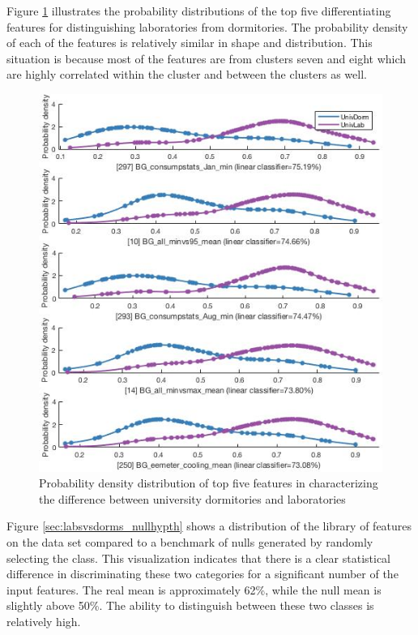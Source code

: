 Figure \ref{fig:topfivefeatures_dormvslab} illustrates the probability distributions of the top five differentiating features for distinguishing laboratories from dormitories. The probability density of each of the features is relatively similar in shape and distribution. This situation is because most of the features are from clusters seven and eight which are highly correlated within the cluster and between the clusters as well.

\begin{figure}[ht!]
\begin{center}
\includegraphics[width=0.7\columnwidth]{figures/Output_UnivDormVsLab_Features_1-5/Output_UnivDormVsLab_Features_1-5}
\caption{{Probability density distribution of top five features in characterizing the difference between university dormitories and laboratories
\label{fig:topfivefeatures_dormvslab}%
}}
\end{center}
\end{figure}

Figure \ref{sec:labsvsdorms_nullhypth} shows a distribution of the library of features on the data set compared to a benchmark of nulls generated by randomly selecting the class. This visualization indicates that there is a clear statistical difference in discriminating these two categories for a significant number of the input features. The real mean is approximately 62\%, while the null mean is slightly above 50\%. The ability to distinguish between these two classes is relatively high.

